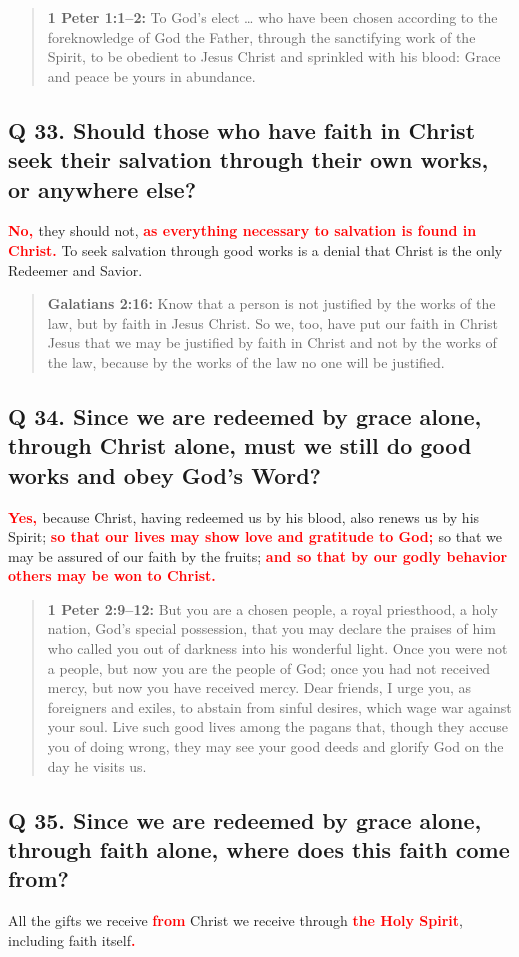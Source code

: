 \documentclass[titlepage]{memoir}
\newcommand\Children[1]{\textbf{\textcolor{red}{#1}}}
\newcommand\Quote[2]{\begin{quote}{\small\textbf{#1:}{ #2}}\end{quote}}
\begin{document}
\Quote{1 Peter 1:1--2}{To God's elect {\dots} who have been chosen according to the foreknowledge of God the Father, through the sanctifying work of the Spirit, to be obedient to Jesus Christ and sprinkled with his blood: Grace and peace be yours in abundance.}

\subsection{Q 33. Should those who have faith in Christ seek their salvation through their own works, or anywhere else?}
\Children{No, }they should not, \Children{as everything necessary to salvation is found in Christ.} To seek salvation through good works is a denial that Christ is the only Redeemer and Savior.

\Quote{Galatians 2:16}{Know that a person is not justified by the works of the law, but by faith in Jesus Christ. So we, too, have put our faith in Christ Jesus that we may be justified by faith in Christ and not by the works of the law, because by the works of the law no one will be justified.}

\subsection{Q 34. Since we are redeemed by grace alone, through Christ alone, must we still do good works and obey God's Word?}
\Children{Yes, }because Christ, having redeemed us by his blood, also renews us by his Spirit; \Children{so that our lives may show love and gratitude to God; }so that we may be assured of our faith by the fruits; \Children{and so that by our godly behavior others may be won to Christ.}

\Quote{1 Peter 2:9--12}{But you are a chosen people, a royal priesthood, a holy nation, God's special possession, that you may declare the praises of him who called you out of darkness into his wonderful light. Once you were not a people, but now you are the people of God; once you had not received mercy, but now you have received mercy. Dear friends, I urge you, as foreigners and exiles, to abstain from sinful desires, which wage war against your soul. Live such good lives among the pagans that, though they accuse you of doing wrong, they may see your good deeds and glorify God on the day he visits us.}

\subsection{Q 35. Since we are redeemed by grace alone, through faith alone, where does this faith come from?}
All the gifts we receive \Children{from} Christ we receive through \Children{the Holy Spirit}, including faith itself\Children{.}
\end{document}

